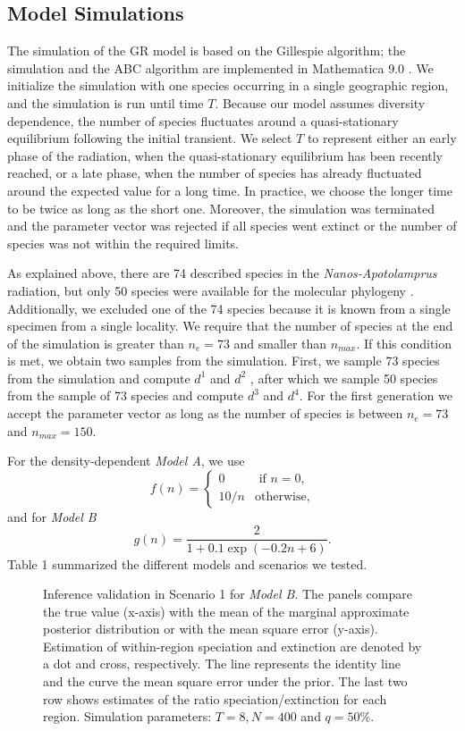 \subsection*{Model Simulations}
\noindent The simulation of the GR model is based on the Gillespie algorithm; the simulation and the ABC algorithm are implemented in Mathematica 9.0 \citep{Wolfram2013}. 
We initialize the simulation with one species occurring in a single geographic region, and the simulation is run until time $T$. 
Because our model assumes diversity dependence, the number of species fluctuates around a quasi-stationary equilibrium following the initial transient. 
We select $T$ to represent either an early phase of the radiation, when the quasi-stationary equilibrium has been recently reached, or a late phase, when the number of species has already fluctuated around the expected value for a long time. 
In practice, we choose the longer time to be twice as long as the short one. 
Moreover, the simulation was terminated and the parameter vector was rejected if all species went extinct or the number of species was not within the required limits. 

As explained above, there are 74 described species in the \textit{Nanos-Apotolamprus} radiation, but only 50 species were available for the molecular phylogeny \citep{Miraldo2014}. Additionally, we excluded one of the 74 species because it is known from a single specimen from a single locality. 
We require that the number of species at the end of the simulation is greater than $n_e=73$ and smaller than $n_{max}$. 
If this condition is met, we obtain two samples from the simulation. 
First, we sample 73 species from the simulation and compute $d^1$ and $d^2$ , after which we sample 50 species from the sample of 73 species and compute $d^3$ and $d^4$. 
For the first generation we accept the parameter vector as long as the number of species is between $n_e=73$ and $n_{max}=150$.

For the density-dependent \textit{Model A}, we use 
\[
	f(n)=
	\begin{cases}
		0 &\mbox{ if } n=0, \\
		10/n &\mbox{otherwise},
		\end{cases}
\]
and for \textit{Model B}
\[
	g(n)= \frac{2}{1+ 0.1 \exp(- 0.2 n+6)}.
\]
Table 1 summarized the different models and scenarios we tested.
%
\begin{figure*}[t]
\begin{center}
\caption{Inference validation in Scenario 1 for \textit{Model B}.
	The panels compare the true value (x-axis) with the mean of the marginal approximate posterior distribution or with the mean 		square error (y-axis).
 	Estimation of within-region speciation and extinction are denoted by a dot and cross, respectively. 
 	The line represents the identity line and the curve the mean square error under the prior. 
 	The last two row shows estimates of the ratio speciation/extinction for each region. Simulation parameters: $T = 8, N = 400$ 			and $q = 50\%$.}
\label{fig:2}
\vspace{-0.3in}
\end{center}
\end{figure*}

